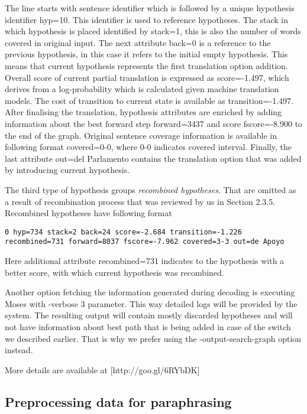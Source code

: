The line starts with sentence identifier which is followed by a unique hypothesis identifier \textsf{hyp=10}. This identifier is used to reference hypotheses. The stack in which hypothesis is placed identified by \textsf{stack=1}, this is also the number of words covered in original input. The next attribute \textsf{back=0} is a reference to the previous hypothesis, in this case it refers to the initial empty hypothesis. This means that current hypothesis represents the first translation option addition. Overall score of current partial translation is expressed as \textsf{score=-1.497}, which derives from a log-probability which is calculated given machine translation models. The cost of transition to current state is available as \textsf{transition=-1.497}. After finalising the translation, hypothesis attributes are enriched by adding information about the best forward step \textsf{forward=3437} and score \textsf{fscore=-8.900} to the end of the graph. Original sentence coverage information is available in following format \textsf{covered=0-0}, where \textsf{0-0} indicates covered interval.
Finally, the last attribute \textsf{out=del Parlamento} contains the translation option that was added by introducing current hypothesis.

The third type of hypothesis groups \textit{recombined hypotheses}. That are omitted as a result of recombination process that was reviewed by us in Section 2.3.5. Recombined hypotheses have following format

\begin{verbatim}
0 hyp=734 stack=2 back=24 score=-2.684 transition=-1.226 
recombined=731 forward=8037 fscore=-7.962 covered=3-3 out=de Apoyo
\end{verbatim}

Here additional attribute \textsf{recombined=731} indicates to the hypothesis with a better score, with which current hypothesis was recombined.

Another option fetching the information generated during decoding is executing Moses with \textsf{-verbose 3} parameter. This way detailed logs will be provided by the system. The resulting output will contain mostly discarded hypotheses and will not have information about best path that is being added in case of the switch we described earlier. That is why we prefer using the \textsf{-output-search-graph} option instead.

More details are available at [http://goo.gl/6RYbDK]

\subsection{Preprocessing data for paraphrasing}

